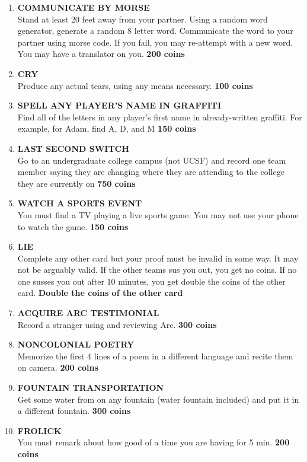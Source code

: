 \documentclass{article}
\begin{document}
\begin{enumerate}
    \item \textbf{COMMUNICATE BY MORSE} \\ Stand at least 20 feet away from your partner. Using a random word generator, generate a random 8 letter word. Communicate the word to your partner using morse code. If you fail, you may re-attempt with a new word. You may have a translator on you. \textbf{200 coins}
    \item \textbf{CRY} \\ Produce any actual tears, using any means necessary. \textbf{100 coins}
    \item \textbf{SPELL ANY PLAYER'S NAME IN GRAFFITI} \\ Find all of the letters in any player's first name in already-written graffiti. For example, for Adam, find A, D, and M \textbf{150 coins}
    \item \textbf{LAST SECOND SWITCH} \\
    Go to an undergraduate college campus (not UCSF) and record one team member saying they are changing where they are attending to the college they are currently on \textbf{750 coins}
    \item \textbf{WATCH A SPORTS EVENT} \\You must find a TV playing a live sports game. You may not use your phone to watch the game. \textbf{150 coins}
    \item \textbf{LIE} \\ Complete any other card but your proof must be invalid in some way. It may not be arguably valid. If the other teams sus you out, you get no coins. If no one susses you out after 10 minutes, you get double the coins of the other card. \textbf{Double the coins of the other card}
    \item \textbf{ACQUIRE ARC TESTIMONIAL} \\  Record a stranger using and reviewing Arc. \textbf{300 coins}
    \item \textbf{NONCOLONIAL POETRY} \\ Memorize the first 4 lines of a poem in a different language and recite them on camera. \textbf{200 coins}
    \item \textbf{FOUNTAIN TRANSPORTATION} \\Get some water from on any fountain (water fountain included) and put it in a different fountain. \textbf{300 coins}
    \item \textbf{FROLICK} \\ You must remark about how good of a time you are having for 5 min. \textbf{200 coins}

\end{enumerate}
\end{document}
